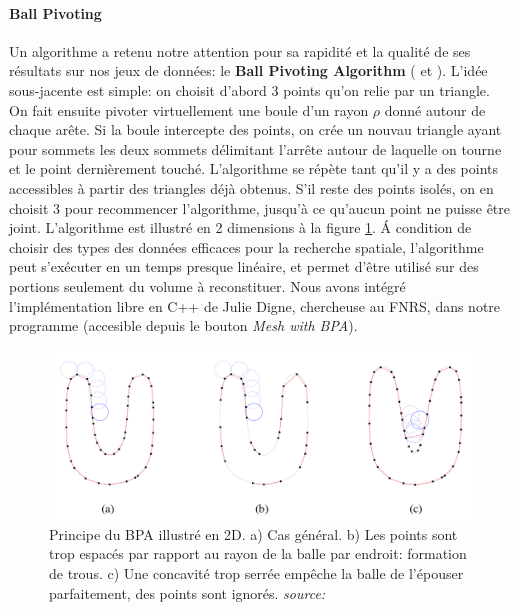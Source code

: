 \documentclass[a4paper,10pt]{report}
\begin{document}
\paragraph{Ball Pivoting}\label{BPA}
Un algorithme a retenu notre attention pour sa rapidité et la qualité de ses résultats sur nos jeux de données: le \textbf{Ball Pivoting Algorithm} (\cite{bpa} et \cite{Digne}). L'idée sous-jacente est simple: on choisit d'abord 3 points qu'on relie par un triangle. On fait ensuite pivoter virtuellement une boule d'un rayon $ \rho $ donné autour de chaque arête. Si la boule intercepte des points, on crée un nouvau triangle ayant pour sommets les deux sommets délimitant l'arrête autour de laquelle on tourne et le point dernièrement touché. L'algorithme se répète tant qu'il y a des points accessibles à partir des triangles déjà obtenus. S'il reste des points isolés, on en choisit 3 pour recommencer l'algorithme, jusqu'à ce qu'aucun point ne puisse être joint. L'algorithme est illustré en 2 dimensions à la figure \ref{fig:bpa-principle}. \'A condition de choisir des types des données efficaces pour la recherche spatiale, l'algorithme peut s'exécuter en un temps presque linéaire, et permet d'être utilisé sur des portions seulement du volume à reconstituer\cite{bpa}. Nous avons intégré l'implémentation libre en C++ de Julie Digne\cite{Digne}, chercheuse au FNRS, dans notre programme (accesible depuis le bouton \textit{Mesh with BPA}).

\begin{figure}[h]
	\centering
    \includegraphics[width=\textwidth]{bpa-principle.png}
    \caption{\label{fig:bpa-principle} Principe du BPA illustré en 2D. a) Cas général. b) Les points sont trop espacés par rapport au rayon de la balle par endroit: formation de trous. c) Une concavité trop serrée empêche la balle de l'épouser parfaitement, des points sont ignorés. \textit{source: \cite{bpa}}}
\end{figure}
\end{document}
